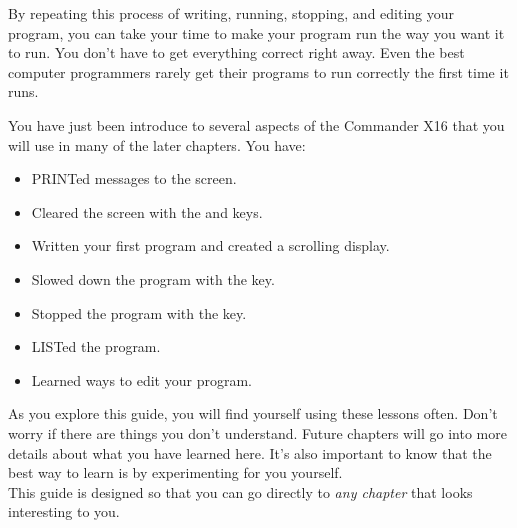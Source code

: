 By repeating this process of writing, running, stopping, and editing your
program, you can take your time to make your program run the way you want it to
run.  You don't have to get everything correct right away.  Even the best
computer programmers rarely get their programs to run correctly the first time
it runs.\\


You have just been introduce to several aspects of the Commander X16 that you
will use in many of the later chapters.  You have:

\begin{itemize}

	\item {\ttfamily PRINT}ed messages to the screen.

	\item Cleared the screen with the \shiftkey and \clrhomekey keys.
	
	\item Written your first program and created a scrolling display.
	
	\item Slowed down the program with the \ctrlkey key.

	\item Stopped the program with the \runstopkey key.

	\item {\ttfamily LIST}ed the program.

	\item Learned ways to edit your program.

\end{itemize}

\vspace{16pt}

As you explore this guide, you will find yourself using these lessons often.
Don't worry if there are things you don't understand.  Future chapters will go
into more details about what you have learned here.  It's also important to
know that the best way to learn is by experimenting for you yourself.\\

This guide is designed so that you can go directly to \emph{any chapter} that
looks interesting to you.


\@openrighttrue\makeatother
